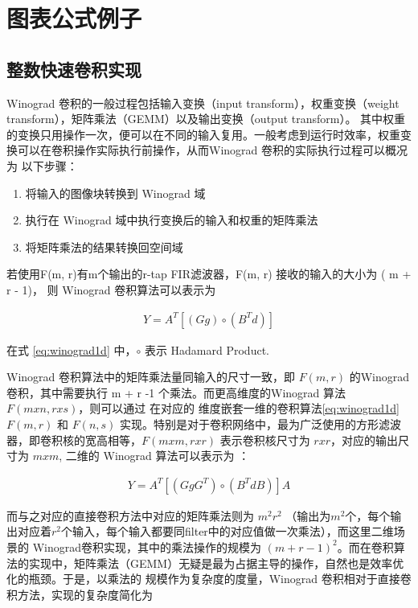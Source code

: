 
\chapter{图表公式例子}
\label{cha:chapter02}

\section{整数快速卷积实现}

Winograd 卷积的一般过程包括输入变换（input transform），权重变换（weight transform），矩阵乘法（GEMM）以及输出变换（output transform）。
其中权重的变换只用操作一次，便可以在不同的输入复用。一般考虑到运行时效率，权重变换可以在卷积操作实际执行前操作，从而Winograd 卷积的实际执行过程可以概况为
以下步骤：
\begin{enumerate}
  \item 将输入的图像块转换到 Winograd 域
  \item 执行在 Winograd 域中执行变换后的输入和权重的矩阵乘法
  \item 将矩阵乘法的结果转换回空间域
\end{enumerate}

若使用F(m, r)有m个输出的r-tap FIR滤波器，F(m, r) 接收的输入的大小为 ( m + r - 1)， 则 Winograd 卷积算法可以表示为

\begin{align}\label{eq:winograd1d}
  Y = A^T [(Gg) \circ (B^Td)]
\end{align}

在式 \ref{eq:winograd1d} 中，$\circ$ 表示 Hadamard Product.

Winograd 卷积算法中的矩阵乘法量同输入的尺寸一致，即 $F(m, r)$ 的Winograd 卷积，其中需要执行 m + r -1 个乘法。而更高维度的Winograd 算法 $F(mxn, rxs)$，则可以通过
在对应的 维度嵌套一维的卷积算法\ref{eq:winograd1d} $F(m, r)$ 和 $F(n, s)$ 实现。特别是对于卷积网络中，最为广泛使用的方形滤波器，即卷积核的宽高相等，$F(m x m, r x r)$
表示卷积核尺寸为 $r x r$，对应的输出尺寸为 $ m x m$, 二维的 Winograd 算法可以表示为 ：

\begin{align}
\label{eq:winograd2d}
  Y = A^T [(GgG^T) \circ (B^TdB)] A
\end{align}

而与之对应的直接卷积方法中对应的矩阵乘法则为 $m^2r^2$ （输出为$m^2$个，每个输出对应着$r^2$个输入，每个输入都要同filter中的对应值做一次乘法），而这里二维场景的
Winograd卷积实现，其中的乘法操作的规模为 $( m + r - 1)^2$。而在卷积算法的实现中，矩阵乘法（GEMM）无疑是最为占据主导的操作，自然也是效率优化的瓶颈。于是，以乘法的
规模作为复杂度的度量，Winograd 卷积相对于直接卷积方法，实现的复杂度简化为

